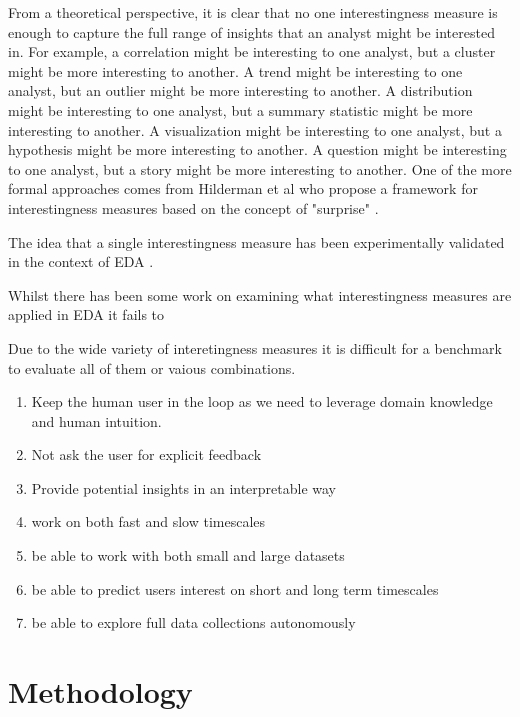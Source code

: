 \documentclass[sigconf, nonacm]{acmart}
\begin{document}
From a theoretical perspective, it is clear that no one interestingness measure is enough to capture the full range of insights that an analyst might be interested in. For example, a correlation might be interesting to one analyst, but a cluster might be more interesting to another. A trend might be interesting to one analyst, but an outlier might be more interesting to another. A distribution might be interesting to one analyst, but a summary statistic might be more interesting to another. A visualization might be interesting to one analyst, but a hypothesis might be more interesting to another. A question might be interesting to one analyst, but a story might be more interesting to another.
One of the more formal approaches comes from Hilderman et al who propose a framework for interestingness measures based on the concept of "surprise" \cite{robertj.hildermanInterestingnessFramework2001}.
\cite{robertj.hildermanInterestingnessFramework2001}

The idea that a single interestingness measure has been experimentally validated in the context of EDA \cite{somechPredictingWhatInteresting2019}.

Whilst there has been some work on examining what interestingness measures are applied in EDA \cite{chansonInterestingnessMeasuresExploratory2025a} it fails to 

Due to the wide variety of interetingness measures it is difficult for a benchmark to evaluate all of them or vaious combinations.


\begin{enumerate}
  \item Keep the human user in the loop as we need to leverage domain knowledge and human intuition.
  \item Not ask the user for explicit feedback 
  \item Provide potential insights in an interpretable way
  \item work on both fast and slow timescales 
  \item be able to work with both small and large datasets
  \item be able to predict users interest on short and long term timescales
  \item be able to explore full data collections autonomously
\end{enumerate}


\section{Methodology}
\end{document}
